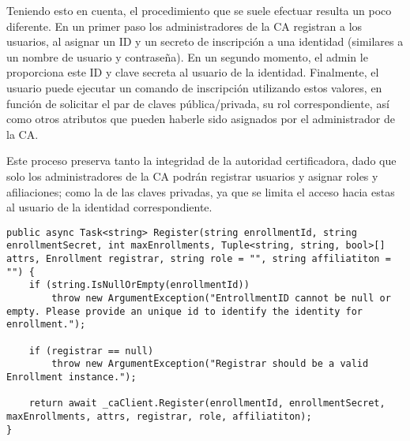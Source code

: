 Teniendo esto en cuenta, el procedimiento que se suele efectuar resulta un poco diferente. En un primer paso los administradores de la CA registran a los usuarios, al asignar un ID y un secreto de inscripción a una identidad (similares a un nombre de usuario y contraseña). En un segundo momento, el admin le proporciona este ID y clave secreta al usuario de la identidad. Finalmente, el usuario puede ejecutar un comando de inscripción utilizando estos valores, en funci\'on de solicitar el par de claves pública/privada, su rol correspondiente, as\'i como otros atributos que pueden haberle sido asignados por el administrador de la CA.

Este proceso preserva tanto la integridad de la autoridad certificadora, dado que solo los administradores de la CA podr\'an registrar usuarios y asignar roles y afiliaciones; como la de las claves privadas, ya que se limita el acceso hacia estas al usuario de la identidad correspondiente.

\begin{lstlisting}[caption={M\'etodo \texttt{Register} de la clase \texttt{CAService}.}, label={code:registerServ}]
public async Task<string> Register(string enrollmentId, string enrollmentSecret, int maxEnrollments, Tuple<string, string, bool>[] attrs, Enrollment registrar, string role = "", string affiliatiton = "") {
	if (string.IsNullOrEmpty(enrollmentId))
		throw new ArgumentException("EntrollmentID cannot be null or empty. Please provide an unique id to identify the identity for enrollment.");
	
	if (registrar == null)
		throw new ArgumentException("Registrar should be a valid Enrollment instance.");

	return await _caClient.Register(enrollmentId, enrollmentSecret, maxEnrollments, attrs, registrar, role, affiliatiton);
}
\end{lstlisting}

